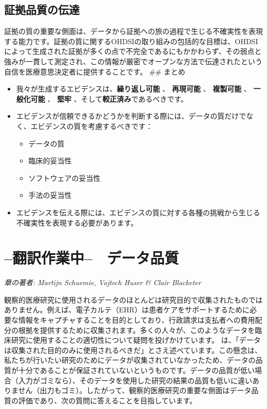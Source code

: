 \documentclass[
  11pt]{book}
\makeatletter
\providecommand{\tightlist}{%
  \setlength{\itemsep}{0pt}\setlength{\parskip}{0pt}}
\newenvironment{kframe}{%
\medskip{}
\setlength{\fboxsep}{.8em}
 \def\at@end@of@kframe{}%
 \ifinner\ifhmode%
  \def\at@end@of@kframe{\end{minipage}}%
  \begin{minipage}{\columnwidth}%
 \fi\fi%
 \def\FrameCommand##1{\hskip\@totalleftmargin \hskip-\fboxsep
 \colorbox{myShadeColor}{##1}\hskip-\fboxsep
     \hskip-\linewidth \hskip-\@totalleftmargin \hskip\columnwidth}%
 \MakeFramed {\advance\hsize-\width
   \@totalleftmargin\z@ \linewidth\hsize
   \@setminipage}}%
 {\par\unskip\endMakeFramed%
 \at@end@of@kframe}
\newenvironment{rmdblock}[1]
  {
  \begin{itemize}
  \renewcommand{\labelitemi}{
    \raisebox{-.7\height}[0pt][0pt]{
      {\setkeys{Gin}{width=3em,keepaspectratio}\texttt{[image: images/\#1]}}
    }
  }
  \setlength{\fboxsep}{1em}
  \begin{kframe}
  \item
  }
  {
  \end{kframe}
  \end{itemize}
  }
\newenvironment{rmdsummary}
  {\begin{rmdblock}{summary}}
  {\end{rmdblock}}
\theoremstyle{definition}
\theoremstyle{definition}
\theoremstyle{definition}
\theoremstyle{definition}
\theoremstyle{remark}
\makeatother
\begin{document}
\section{証拠品質の伝達}\label{ux8a3cux62e0ux54c1ux8ceaux306eux4f1dux9054}

証拠の質の重要な側面は、データから証拠への旅の過程で生じる不確実性を表現する能力です。証拠の質に関するOHDSIの取り組みの包括的な目標は、OHDSIによって生成された証拠が多くの点で不完全であるにもかかわらず、その弱点と強みが一貫して測定され、この情報が厳密でオープンな方法で伝達されたという自信を医療意思決定者に提供することです。 \#\# まとめ

\begin{rmdsummary}
\begin{itemize}
\item
  我々が生成するエビデンスは、\textbf{繰り返し可能} 、 \textbf{再現可能} 、 \textbf{複製可能} 、 \textbf{一般化可能} 、 \textbf{堅牢} 、そして\textbf{較正済み}であるべきです。
\item
  エビデンスが信頼できるかどうかを判断する際には、データの質だけでなく、エビデンスの質を考慮するべきです：

  \begin{itemize}
  \tightlist
  \item
    データの質
  \item
    臨床的妥当性
  \item
    ソフトウェアの妥当性
  \item
    手法の妥当性
  \end{itemize}
\item
  エビデンスを伝える際には、エビデンスの質に対する各種の挑戦から生じる不確実性を表現する必要があります。
\end{itemize}
\end{rmdsummary}

\chapter{--翻訳作業中--　データ品質}\label{DataQuality}

\emph{章の著者: Martijn Schuemie, Vojtech Huser \& Clair Blacketer}

観察的医療研究に使用されるデータのほとんどは研究目的で収集されたものではありません。例えば、電子カルテ（EHR）は患者ケアをサポートするために必要な情報をキャプチャすることを目的としており、行政請求は支払者への費用配分の根拠を提供するために収集されます。多くの人々が、このようなデータを臨床研究に使用することの適切性について疑問を投げかけています。\citet{vanDerLei_1991} は、「データは収集された目的のみに使用されるべきだ」とさえ述べています。この懸念は、私たちが行いたい研究のためにデータが収集されていなかったため、データの品質が十分であることが保証されていないというものです。データの品質が低い場合（入力がゴミなら）、そのデータを使用した研究の結果の品質も低いに違いありません（出力もゴミ）。したがって、観察的医療研究の重要な側面はデータ品質の評価であり、次の質問に答えることを目指しています。
\end{document}
